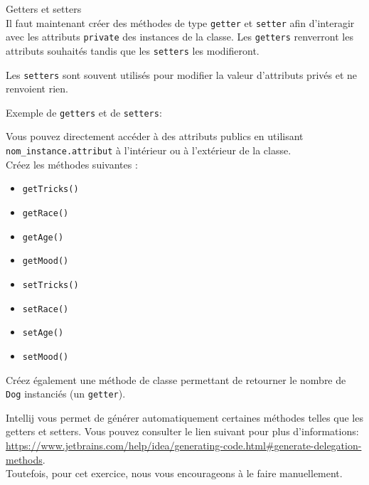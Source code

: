 \begin{Exercice}[10 minutes] Getters et setters\\
    Il faut maintenant créer des méthodes de type \lstinline{getter} et \lstinline{setter} afin d'interagir avec les attributs \lstinline{private} des instances de la classe. 
    Les \lstinline{getters} renverront les attributs souhaités tandis que les \lstinline{setters} les modifieront.

    Les \lstinline{setters} sont souvent utilisés pour modifier la valeur d'attributs privés et ne renvoient rien.
    \begin{conseil}
        Exemple de \lstinline{getters} et de \lstinline{setters}:
        
    \end{conseil} 

    Vous pouvez directement accéder à des attributs publics en utilisant \lstinline{nom_instance.attribut} à l'intérieur ou à l'extérieur de la classe. \\
    
    Créez les méthodes suivantes :
    \begin{itemize}
    \item \lstinline{getTricks()}
    \item \lstinline{getRace()}
    \item \lstinline{getAge()}
    \item \lstinline{getMood()}
    \item \lstinline{setTricks()}
    \item \lstinline{setRace()}
    \item \lstinline{setAge()}
    \item \lstinline{setMood()}
    \end{itemize}
    
    Créez également une méthode de classe permettant de retourner le nombre de \lstinline{Dog} instanciés (un \lstinline{getter}).
   	
\begin{conseil}
    Intellij vous permet de générer automatiquement certaines méthodes telles que les getters et setters. Vous pouvez consulter le lien suivant pour plus d'informations: \url{https://www.jetbrains.com/help/idea/generating-code.html\#generate-delegation-methods}.
    \\
    Toutefois, pour cet exercice, nous vous encourageons à le faire manuellement.
\end{conseil}
    
\begin{solution}
	
\end{solution}
\end{Exercice}


